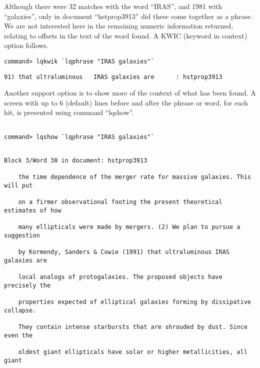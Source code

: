 Although there were 32 matches with the word ``IRAS'', and 1981 with
``galaxies'', only in document ``hstprop3913'' did these come together as 
a phrase.  We are not interested here in the remaining numeric information 
returned, relating to offsets in the text of the word found. 
A KWIC (keyword in context) option follows.

\begin{verbatim}
command> lqkwik `lqphrase "IRAS galaxies"`
\end{verbatim}

\begin{footnotesize}
\begin{verbatim}
91) that ultraluminous   IRAS galaxies are      : hstprop3913
\end{verbatim}
\end{footnotesize}

Another support option is to show more of the context of what
has been found.  A screen with up to 6 (default) lines before 
and after the phrase or word, for each hit, is presented using
command ``lqshow''.

\begin{verbatim}

command> lqshow `lqphrase "IRAS galaxies"`

\end{verbatim}

\begin{footnotesize}

\begin{verbatim}

Block 3/Word 38 in document: hstprop3913

    the time dependence of the merger rate for massive galaxies. This will put

    on a firmer observational footing the present theoretical estimates of how

    many ellipticals were made by mergers. (2) We plan to pursue a suggestion

    by Kormendy, Sanders & Cowie (1991) that ultraluminous IRAS galaxies are

    local analogs of protogalaxies. The proposed objects have precisely the

    properties expected of elliptical galaxies forming by dissipative collapse.

    They contain intense starbursts that are shrouded by dust. Since even the

    oldest giant ellipticals have solar or higher metallicities, all giant


\end{verbatim}

\end{footnotesize}

